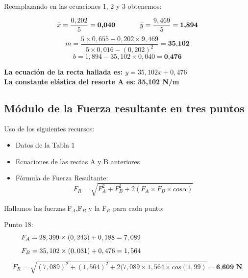 \documentclass[10pt]{article}
\begin{document}
\vspace{0,2cm}
Reemplazando en las ecuaciones 1, 2 y 3 obtenemos:

\begin{equation*}
    \Bar{x} = \frac{0,202}{5} = \textbf{0,040} \textcolor{Blanco}{.............} \Bar{y} = \frac{9,469}{5} = \textbf{1,894}
\end{equation*}
\vspace{0,1cm}
\begin{equation*}
    m = \frac{5\times0,655-0,202\times9,469}{5\times0,016 - (0,202)^{2}} = \textbf{35,102} 
\end{equation*}
\vspace{0,1cm}
\begin{equation*}
    b = 1,894 - 35,102\times0,040 = \textbf{0,476}
\end{equation*}

\vspace{-0,7cm}
\begin{center}
\textbf{La ecuación de la recta hallada es: $y = 35,102x + 0,476$}\\[0,3cm]
\textbf{La constante elástica del resorte A es: 35,102 N/m}
\end{center}

\newpage
\hspace{1cm}


\subsection{Módulo de la Fuerza resultante en tres puntos}\vspace{2mm}

Uso de los siguientes recursos:
\begin{itemize}
    \item Datos de la Tabla 1
    \item Ecuaciones de las rectas A y B anteriores
    \item Fórmula de Fuerza Resultante:
    \large{\begin{equation}
        F_{R} = \sqrt{F^{2}_{A} + F^{2}_{B} + 2(F_{A} \times F_{B} \times cos \alpha)}
    \end{equation}}
\end{itemize}

\vspace{0,2cm}
Hallamos las fuerzas F$_{A}$,F$_{B}$ y la F$_{R}$  para cada punto:

Punto 18:
 \begin{equation*}
    F_{A} = 28,399 \times (0,243) + 0,188 = 7,089
    \textcolor{Blanco}{--------------}
\end{equation*}
\begin{equation*}
    F_{B} = 35,102 \times (0,031) + 0,476 = 1,564
    \textcolor{Blanco}{--------------}
\end{equation*}  
\begin{equation*}
    F_{R} = \sqrt{(7,089)^{2} + (1,564)^{2} + 2(7,089 \times 1,564 \times cos(1,99)} = \textbf{6,609 N}
\end{equation*}
\vspace{-0,2cm}
\end{document}
